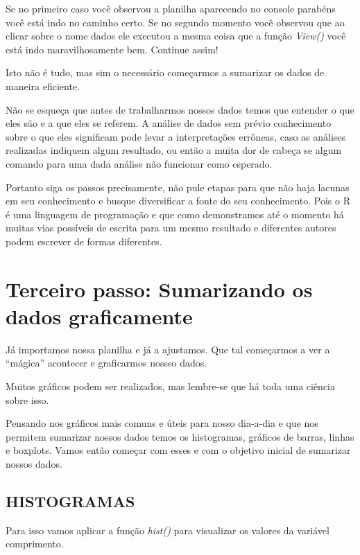 \documentclass[]{book}
\begin{document}
Se no primeiro caso você observou a planilha aparecendo no console parabéns você está indo no caminho certo. Se no segundo momento você observou que ao clicar sobre o nome dados ele executou a mesma coisa que a função \emph{View()} você está indo maravilhosamente bem. Continue assim!

Isto não é tudo, mas sim o necessário começarmos a sumarizar os dados de maneira eficiente.

Não se esqueça que antes de trabalharmos nossos dados temos que entender o que eles são e a que eles se referem. A análise de dados sem prévio conhecimento sobre o que eles significam pode levar a interpretações errôneas, caso as análises realizadas indiquem algum resultado, ou então a muita dor de cabeça se algum comando para uma dada análise não funcionar como esperado.

Portanto siga os passos precisamente, não pule etapas para que não haja lacunas em seu conhecimento e busque diversificar a fonte do seu conhecimento. Pois o R é uma linguagem de programação e que como demonstramos até o momento há muitas vias possíveis de escrita para um mesmo resultado e diferentes autores podem escrever de formas diferentes.

\hypertarget{terceiro-passo-sumarizando-os-dados-graficamente}{%
\section{Terceiro passo: Sumarizando os dados graficamente}\label{terceiro-passo-sumarizando-os-dados-graficamente}}

Já importamos nossa planilha e já a ajustamos. Que tal começarmos a ver a ``mágica'' acontecer e graficarmos nossso dados.

Muitos gráficos podem ser realizados, mas lembre-se que há toda uma ciência sobre isso.

Pensando nos gráficos mais comuns e úteis para nosso dia-a-dia e que nos permitem sumarizar nossos dados temos os histogramas, gráficos de barras, linhas e boxplots. Vamos então começar com esses e com o objetivo inicial de sumarizar nossos dados.

\hypertarget{histogramas}{%
\subsection{HISTOGRAMAS}\label{histogramas}}

Para isso vamos aplicar a função \emph{hist()} para visualizar os valores da variável comprimento.
\end{document}
